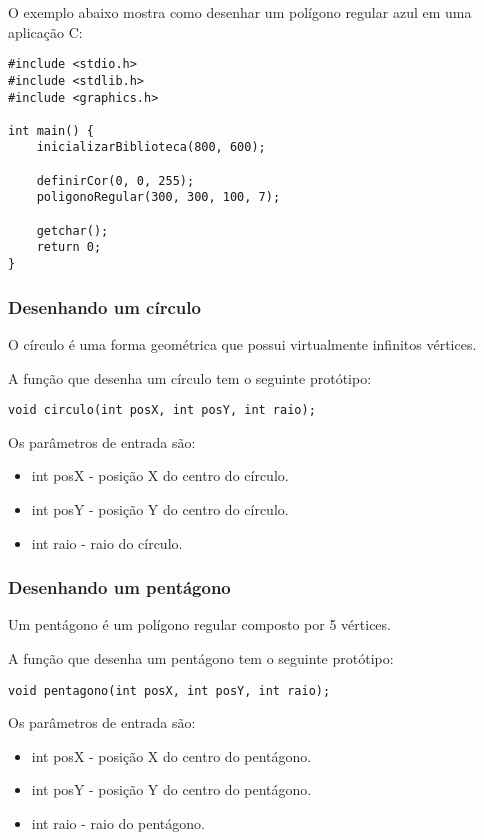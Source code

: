 \documentclass[12pt, %
openright,
oneside, %
a4paper,    %
brazil]{facom-ufu-abntex2}
\begin{document}
O exemplo abaixo mostra como desenhar um polígono regular azul em uma aplicação C:

\begin{verbatim}
#include <stdio.h>
#include <stdlib.h>
#include <graphics.h>

int main() {
    inicializarBiblioteca(800, 600);

    definirCor(0, 0, 255);
    poligonoRegular(300, 300, 100, 7);

    getchar();
    return 0;
}
\end{verbatim}

\subsubsection{Desenhando um círculo}
O círculo é uma forma geométrica que possui virtualmente infinitos vértices.

A função que desenha um círculo tem o seguinte protótipo:

\begin{verbatim}
void circulo(int posX, int posY, int raio);
\end{verbatim}

Os parâmetros de entrada são:

\begin{itemize}
    \item int posX - posição X do centro do círculo.
    \item int posY - posição Y do centro do círculo.
    \item int raio - raio do círculo.
\end{itemize}

\subsubsection{Desenhando um pentágono}
Um pentágono é um polígono regular composto por 5 vértices.

A função que desenha um pentágono tem o seguinte protótipo:

\begin{verbatim}
void pentagono(int posX, int posY, int raio);
\end{verbatim}

Os parâmetros de entrada são:

\begin{itemize}
    \item int posX - posição X do centro do pentágono.
    \item int posY - posição Y do centro do pentágono.
    \item int raio - raio do pentágono.
\end{itemize}
\end{document}
